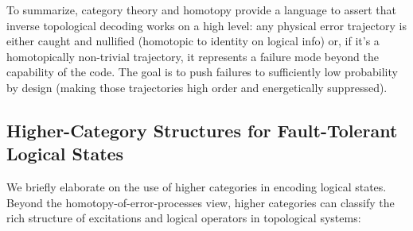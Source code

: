 \documentclass[11pt]{article}
\begin{document}
To summarize, category theory and homotopy provide a language to assert that inverse topological decoding works on a high level: any physical error trajectory is either caught and nullified (homotopic to identity on logical info) or, if it's a homotopically non-trivial trajectory, it represents a failure mode beyond the capability of the code. The goal is to push failures to sufficiently low probability by design (making those trajectories high order and energetically suppressed).

\subsection{Higher-Category Structures for Fault-Tolerant Logical States}
We briefly elaborate on the use of higher categories in encoding logical states. Beyond the homotopy-of-error-processes view, higher categories can classify the rich structure of excitations and logical operators in topological systems:
\end{document}
